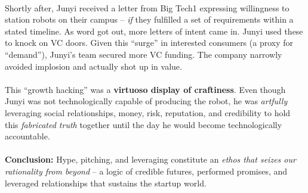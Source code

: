 \documentclass[a4paper,12pt]{article}
\begin{document}
\\
\noindent Shortly after, Junyi received a letter from Big Tech1 expressing willingness to station robots on their campus -- \emph{if} they fulfilled a set of requirements within a stated timeline. As word got out, more letters of intent came in. Junyi used these to knock on VC doors. Given this ``surge'' in interested consumers (a proxy for ``demand''), Junyi's team secured more VC funding. The company narrowly avoided implosion and actually shot up in value. \\
\\
\noindent This ``growth hacking'' was a \textbf{virtuoso display of craftiness}. Even though Junyi was not technologically capable of producing the robot, he was \emph{artfully} leveraging social relationships, money, risk, reputation, and credibility to hold this \emph{fabricated truth} together until the day he would become technologically accountable. \\
\\
\noindent \textbf{Conclusion:} Hype, pitching, and leveraging constitute an \emph{ethos that seizes our rationality from beyond} -- a logic of credible futures, performed promises, and leveraged relationships that sustains the startup world.
\end{document}
